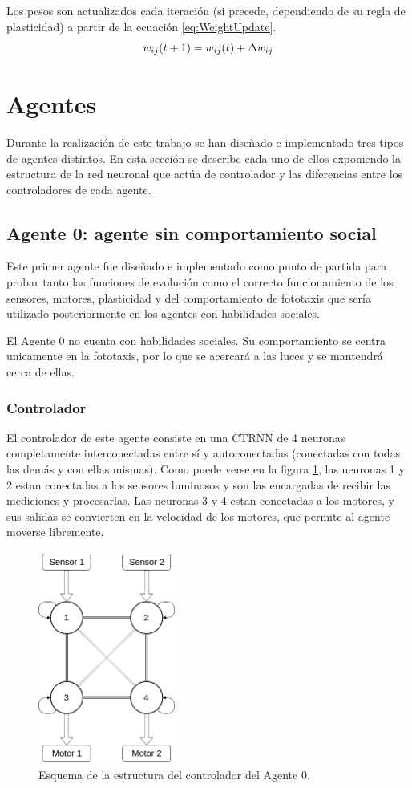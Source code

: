 Los pesos son actualizados cada iteración (si precede, dependiendo de su regla de plasticidad) a partir de la ecuación \ref{eq:WeightUpdate}.
\begin{equation} \label{eq:WeightUpdate}
 \centering
 w_{ij}(t+1) = w_{ij}(t) + \Delta w_{ij}
\end{equation}

\section{Agentes}
Durante la realización de este trabajo se han diseñado e implementado tres tipos de agentes distintos. En esta sección se describe cada uno de ellos exponiendo la estructura de la red neuronal que actúa de controlador
y las diferencias entre los controladores de cada agente.
\subsection{Agente 0: agente sin comportamiento social}
Este primer agente fue diseñado e implementado como punto de partida para probar tanto las funciones de evolución como el correcto funcionamiento de los sensores, motores, plasticidad y del comportamiento de fototaxis
que sería utilizado posteriormente en los agentes con habilidades sociales.

El Agente 0 no cuenta con habilidades sociales. Su comportamiento se centra unicamente en la fototaxis, por lo que se acercará a las luces y se mantendrá cerca de ellas.

\subsubsection{Controlador}
El controlador de este agente consiste en una CTRNN de 4 neuronas completamente interconectadas entre sí y autoconectadas (conectadas con todas las demás y con ellas mismas). Como puede verse en la figura \ref{fig:a0Controller},
las neuronas 1 y 2 estan conectadas a los sensores luminosos y son las encargadas de recibir las mediciones y procesarlas. Las neuronas 3 y 4 estan conectadas a los motores, y sus salidas se convierten en la velocidad de los
motores, que permite al agente moverse libremente.

\begin{figure}[H]
	\centering
	\includegraphics[width=0.4\textwidth,height=7cm]{Imagenes/Agent0Controller}
	\caption{Esquema de la estructura del controlador del Agente 0.}
	\label{fig:a0Controller}
\end{figure}

